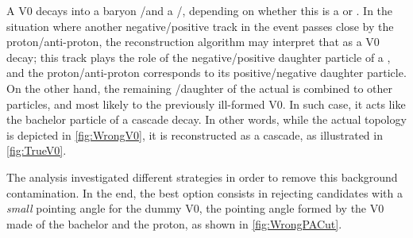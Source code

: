 A V0 decays into a baryon \proton/\pbar and a \rmPiMinus/\rmPiPlus, depending on whether this is a \rmLambda or \rmAlambda. In the situation where another negative/positive track in the event passes close by the proton/anti-proton, the reconstruction algorithm may interpret that as a V0 decay; this track plays the role of the negative/positive daughter particle of a \rmLambdaPM, and the proton/anti-proton corresponds to its positive/negative daughter particle. On the other hand, the remaining \rmPiMinus/\rmPiPlus daughter of the actual \rmLambdaPM is combined to other particles, and most likely to the previously ill-formed V0. In such case, it acts like the bachelor particle of a cascade decay. In other words, while the actual topology is depicted in \fig\ref{fig:WrongV0}, it is reconstructed as a cascade, as illustrated in \fig\ref{fig:TrueV0}.

The analysis \cite{silvadealbuquerqueMultistrangeHadronsPb2019} investigated different strategies in order to remove this background contamination. In the end, the best option consists in rejecting candidates with a \emph{small} pointing angle for the dummy V0, \ie the pointing angle formed by the V0 made of the bachelor and the proton, as shown in \fig\ref{fig:WrongPACut}.


